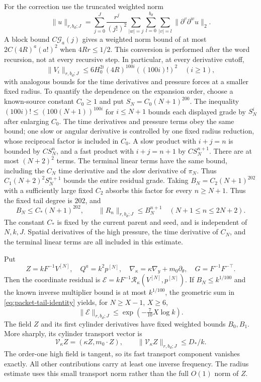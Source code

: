 \documentclass[11pt]{article}
\theoremstyle{definition}
\begin{document}
For the correction use the truncated weighted norm
\[
 \|u\|_{r,b_d;J}
 =\sum_{j=0}^J\frac{r^j}{(j!)^2}
     \sum_{|w|=j}\sum_{l=0}^{b_d}\sum_{|v|=l}\|\partial^v\partial^wu\|_2.
\]
A block bound
$C\mathcal G_a(j)$ gives a weighted norm bound of at most
$2C(4R)^a(a!)^2$ when $4Rr\le1/2$.
This conversion is performed after the word recursion, not at every
recursive step. In particular, at every derivative cutoff,
\[
 \|V_i\|_{r,b_d;J}\le
  6H_0^{2i}(4R)^{100i}((100i)!)^2\quad(i\ge1),
\]
with analogous bounds for the time derivatives and pressure
forces at a smaller fixed radius. To quantify the dependence on the
expansion order, choose a known-source constant
$C_0\ge1$ and put $S_N=C_0(N+1)^{200}$. The inequality
$(100i)!\le(100(N+1))^{100i}$ for $i\le N+1$ bounds each displayed
grade by $S_N^i$ after enlarging $C_0$. The time derivatives
and pressure terms obey the same bound; one slow or angular derivative
is controlled by one fixed radius reduction, whose reciprocal factor is
included in $C_0$. A slow product with $i+j=n$ is bounded by
$C S_N^n$, and a fast product with $i+j=n+1$ by $C S_N^{n+1}$.
There are at most
$(N+2)^2$ terms. The terminal linear terms have the same bound, including
the $C_N$ time derivative and the slow derivative of $\pi_N$.
Thus $C_1(N+2)^2S_N^{n+1}$ bounds the entire residual grade. Taking
$B_N=C_2(N+1)^{202}$ with a sufficiently large fixed $C_2$ absorbs this
factor for every $n\ge N+1$. Thus the fixed tail degree is $202$, and
\begin{equation}\label{eq:packet-tail-base}
 B_N\le C_*(N+1)^{202},\qquad
 \|R_n\|_{r,b_d;J}\le B_N^{n+1}\quad(N+1\le n\le2N+2).
\end{equation}
The constant $C_*$ is fixed by the current parent and seed, and is
independent of $N,k,J$. Spatial derivatives of the high pressure, the
time derivative of $C_N$, and the terminal linear terms are all included
in this estimate.

Put
\begin{equation}\label{eq:packet-coordinate-change}
 Z=kF^{-1}V^{[N]},\quad Q^a=k^2p^{[N]},\quad
 \nabla_\kappa=\kappa\nabla_y+m_0\partial_\theta,
 \quad G=F^{-1}F^{-\top}.
\end{equation}
Then the coordinate residual is $\mathcal E=kF^{-1}\mathcal
R_\kappa(V^{[N]},p^{[N]})$. If $B_N\le k^{1/100}$ and the known inverse
multiplier bound is at most $k^{1/100}$, the geometric sum in
\eqref{eq:packet-tail-identity} yields, for $N\ge X-1$, $X\ge6$,
\begin{equation}\label{eq:packet-small-residual}
 \|\mathcal E\|_{r,b_d;J}
       \le \exp(-\tfrac7{10}X\log k).
\end{equation}
The field $Z$ and its first cylinder derivatives have fixed weighted
bounds $B_0,B_1$. More sharply, its cylinder transport vector is
\[
 \mathcal V_\kappa Z=(\kappa Z,m_0\cdot Z),
 \qquad \|\mathcal V_\kappa Z\|_{r,b_d;J}\le D_*/k.
\]
The order-one high field is tangent, so its fast transport component
vanishes exactly. All other contributions carry at least one inverse
frequency. The radius estimate uses this small transport norm rather than the
full $O(1)$ norm of $Z$.
\end{document}

